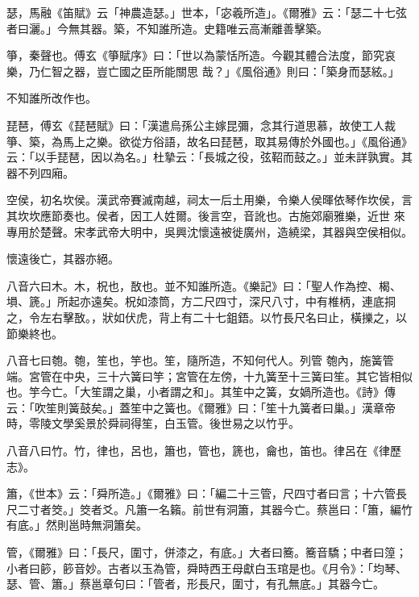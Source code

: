 \begin{pinyinscope}
 瑟，馬融《笛賦》云「神農造瑟。」世本，「宓羲所造」。《爾雅》云：「瑟二十七弦者曰灑。」今無其器。築，不知誰所造。史籍唯云高漸離善擊築。



 箏，秦聲也。傅玄《箏賦序》曰：「世以為蒙恬所造。今觀其體合法度，節究哀樂，乃仁智之器，豈亡國之臣所能關思
 哉？」《風俗通》則曰：「築身而瑟絃。」



 不知誰所改作也。



 琵琶，傅玄《琵琶賦》曰：「漢遣烏孫公主嫁昆彌，念其行道思慕，故使工人裁箏、築，為馬上之樂。欲從方俗語，故名曰琵琶，取其易傳於外國也。」《風俗通》云：「以手琵琶，因以為名。」杜摯云：「長城之役，弦鞀而鼓之。」並未詳孰實。其器不列四廂。



 空侯，初名坎侯。漢武帝賽滅南越，祠太一后土用樂，令樂人侯暉依琴作坎侯，言其坎坎應節奏也。侯者，因工人姓爾。後言空，音訛也。古施郊廟雅樂，近世
 來專用於楚聲。宋孝武帝大明中，吳興沈懷遠被徙廣州，造繞梁，其器與空侯相似。



 懷遠後亡，其器亦絕。



 八音六曰木。木，柷也，敔也。並不知誰所造。《樂記》曰：「聖人作為控、楬、塤、篪。」所起亦遠矣。柷如漆筒，方二尺四寸，深尺八寸，中有椎柄，連底挏之，令左右擊敔。，狀如伏虎，背上有二十七鉏鋙。以竹長尺名曰止，橫擽之，以節樂終也。



 八音七曰匏。匏，笙也，竽也。笙，隨所造，不知何代人。列管
 匏內，施簧管端。宮管在中央，三十六簧曰竽；宮管在左傍，十九簧至十三簧曰笙。其它皆相似也。竽今亡。「大笙謂之巢，小者謂之和」。其笙中之簧，女媧所造也。《詩》傳云：「吹笙則簧鼓矣。」蓋笙中之簧也。《爾雅》曰：「笙十九簧者曰巢。」漢章帝時，零陵文學奚景於舜祠得笙，白玉管。後世易之以竹乎。



 八音八曰竹。竹，律也，呂也，簫也，管也，篪也，龠也，笛也。律呂在《律歷志》。



 簫，《世本》云：「舜所造。」《爾雅》曰：「編二十三管，尺四寸者曰言；十六管長尺二寸者筊。」筊者爻。凡簫一名籟。前世有洞簫，其器今亡。蔡邕曰：「簫，編竹有底。」然則邕時無洞簫矣。



 管，《爾雅》曰：「長尺，圍寸，併漆之，有底。」大者曰簥。簥音驕；中者曰篞；小者曰篎，篎音妙。古者以玉為管，舜時西王母獻白玉琯是也。《月令》：「均琴、瑟、管、簫。」蔡邕章句曰：「管者，形長尺，圍寸，有孔無底。」其器今亡。




\end{pinyinscope}
